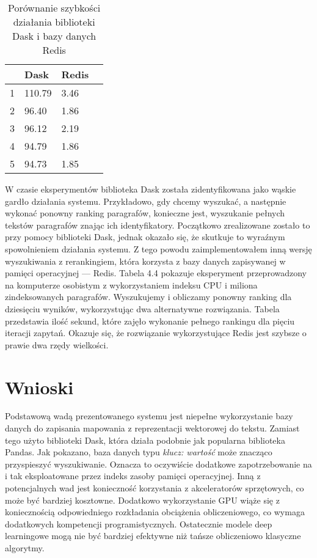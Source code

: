 \begin{table}[htp]
\centering
\caption{Porównanie szybkości działania biblioteki Dask i bazy danych Redis}
\vspace*{5mm}
\begin{tabular}{llll}
\hline
  & Dask & Redis & \\
 \hline
 1 & 110.79 & 3.46 & \\
 2 & 96.40 & 1.86 & \\
 3 & 96.12 & 2.19 \\
 4 & 94.79 & 1.86 \\
 5 & 94.73 &  1.85 \\
 \hline
\end{tabular}
\end{table}

W czasie eksperymentów biblioteka Dask została zidentyfikowana jako wąskie gardło działania systemu. Przykładowo, gdy chcemy wyszukać, a następnie wykonać ponowny ranking paragrafów, konieczne jest, wyszukanie pełnych tekstów paragrafów znając ich identyfikatory. Początkowo zrealizowane zostało to przy pomocy biblioteki Dask, jednak okazało się, że skutkuje to wyraźnym spowolnieniem działania systemu. Z tego powodu zaimplementowałem inną wersję wyszukiwania z rerankingiem, która korzysta z bazy danych zapisywanej w pamięci operacyjnej — Redis. Tabela 4.4 pokazuje eksperyment przeprowadzony na komputerze osobistym z wykorzystaniem indeksu CPU i miliona zindeksowanych paragrafów. Wyszukujemy i obliczamy ponowny ranking dla dziesięciu wyników, wykorzystując dwa alternatywne rozwiązania. Tabela przedstawia ilość sekund, które zajęło wykonanie pełnego rankingu dla pięciu iteracji zapytań. Okazuje się, że rozwiązanie wykorzystujące Redis jest szybsze o prawie dwa rzędy wielkości.

\section{Wnioski}

Podstawową wadą prezentowanego systemu jest niepełne wykorzystanie bazy danych do zapisania mapowania z reprezentacji wektorowej do tekstu. Zamiast tego użyto biblioteki Dask, która działa podobnie jak popularna biblioteka Pandas. Jak pokazano, baza danych typu \emph{klucz: wartość} może znacząco przyspieszyć wyszukiwanie. Oznacza to oczywiście dodatkowe zapotrzebowanie na i tak eksploatowane przez indeks zasoby pamięci operacyjnej. Inną z potencjalnych wad jest konieczność korzystania z akceleratorów sprzętowych, co może być bardziej kosztowne. Dodatkowo wykorzystanie GPU wiąże się z koniecznością odpowiedniego rozkładania obciążenia obliczeniowego, co wymaga dodatkowych kompetencji programistycznych. Ostatecznie modele deep learningowe mogą nie być bardziej efektywne niż tańsze obliczeniowo klasyczne algorytmy.\newline

